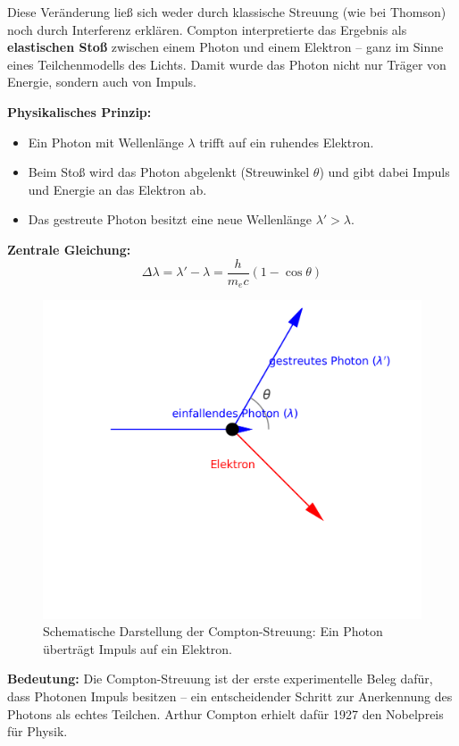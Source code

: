 Diese Veränderung ließ sich weder durch klassische Streuung (wie bei Thomson) noch durch Interferenz erklären. Compton interpretierte das Ergebnis als \textbf{elastischen Stoß} zwischen einem Photon und einem Elektron – ganz im Sinne eines Teilchenmodells des Lichts. Damit wurde das Photon nicht nur Träger von Energie, sondern auch von Impuls.

\textbf{Physikalisches Prinzip:}
\begin{itemize}
	\item Ein Photon mit Wellenlänge \( \lambda \) trifft auf ein ruhendes Elektron.
	\item Beim Stoß wird das Photon abgelenkt (Streuwinkel \( \theta \)) und gibt dabei Impuls und Energie an das Elektron ab.
	\item Das gestreute Photon besitzt eine neue Wellenlänge \( \lambda' > \lambda \).
\end{itemize}

\textbf{Zentrale Gleichung:}
\[
\Delta \lambda = \lambda' - \lambda = \frac{h}{m_e c}(1 - \cos \theta)
\]

\medskip
\begin{figure}[H]
	\begin{center}
		
		
		\includegraphics[width=0.6\linewidth]{bilder/compton-schema.png}
	\end{center}
	\caption{Schematische Darstellung der Compton-Streuung: Ein Photon überträgt Impuls auf ein Elektron.}
\end{figure}

\textbf{Bedeutung:}  
Die Compton-Streuung ist der erste experimentelle Beleg dafür, dass Photonen Impuls besitzen – ein entscheidender Schritt zur Anerkennung des Photons als echtes Teilchen. Arthur Compton erhielt dafür 1927 den Nobelpreis für Physik.

